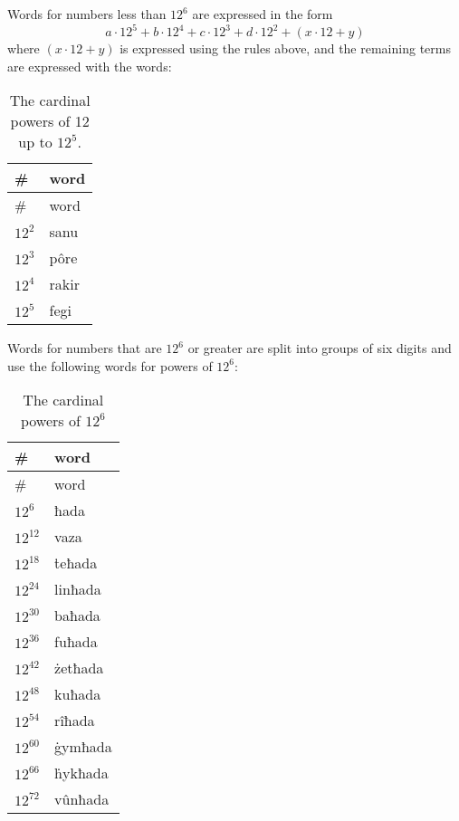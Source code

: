 \documentclass{book}
\begin{document}
Words for numbers less than $12^6$ are expressed in the form \[a \cdot 12^5 + b \cdot 12^4 + c \cdot 12^3 + d \cdot 12^2 + (x \cdot 12 + y)\]
where $(x \cdot 12 + y)$ is expressed using the rules above, and the remaining terms are expressed with the words:

\begin{longtable}[c]{|l|l|}
    \caption{The cardinal powers of 12 up to $12^5$.} \\
    
    \hline
    \# & word \\
    \hline
    \endfirsthead
    
    \hline
    \# & word \\
    \hline
    \endhead
    
    \hline
    \endfoot
    
    \hline
    \endlastfoot
    
    $12^2$ & sanu \\
    $12^3$ & pôre \\
    $12^4$ & rakir \\
    $12^5$ & fegi \\
\end{longtable}

Words for numbers that are $12^6$ or greater are split into groups of six digits and use the following words for powers of $12^6$:

\begin{longtable}[c]{|l|l|}
    \caption{The cardinal powers of $12^6$} \\
    
    \hline
    \# & word \\
    \hline
    \endfirsthead
    
    \hline
    \# & word \\
    \hline
    \endhead
    
    \hline
    \endfoot
    
    \hline
    \endlastfoot
    
    $12^6$ & ħada \\
    $12^{12}$ & vaza \\
    $12^{18}$ & ṫeħada \\
    $12^{24}$ & linħada \\
    $12^{30}$ & baħada \\
    $12^{36}$ & fuħada \\
    $12^{42}$ & żetħada \\
    $12^{48}$ & kuħada \\
    $12^{54}$ & rîħada \\
    $12^{60}$ & ġymħada \\
    $12^{66}$ & ḣykħada \\
    $12^{72}$ & vûnħada \\
\end{longtable}
\end{document}
